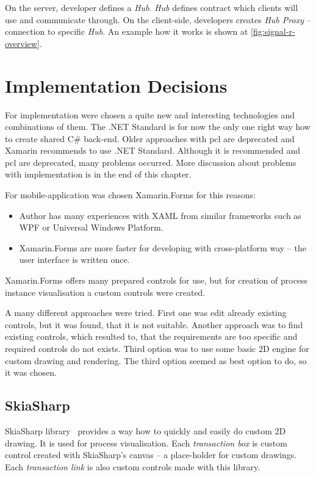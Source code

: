 On the server, developer defines a \textit{Hub}. \textit{Hub} defines contract which clients will use and communicate through. On the client-side, developers creates \textit{Hub Proxy} -- connection to specific \textit{Hub}. An example how it works is shown at \cref{fig:signal-r-overview}.
\section{Implementation Decisions}
For implementation were chosen a quite new and interesting technologies and combinations of them.
The .NET Standard is for now the only one right way how to create shared C\# back-end. Older approaches with \gls{pcl} are deprecated and Xamarin recommends to use .NET Standard. Although it is recommended and \gls{pcl} are deprecated, many problems occurred. More discussion about problems with implementation is in the end of this chapter.

For mobile-application was chosen Xamarin.Forms for this reasons:
\begin{itemize}
\item Author has many experiences with XAML from similar frameworks such as WPF or Universal Windows Platform.
\item Xamarin.Forms are more faster for developing with cross-platform way -- the user interface is written once.
\end{itemize}

Xamarin.Forms offers many prepared controls for use, but for creation of process instance visualisation a custom controls were created.  

A many different approaches were tried. First one was edit already existing controls, but it was found, that it is not suitable. Another approach was to find existing controls, which resulted to, that the requirements are too specific and required controls do not exists. Third option was to use some basic 2D engine for custom drawing and rendering. The third option seemed as best option to do, so it was chosen. 
\subsection{SkiaSharp}
SkiaSharp library~\cite{skiasharp} provides a way how to quickly and easily do custom 2D drawing. It is used for process visualisation. Each \textit{transaction box} is custom control created with SkiaSharp's canvas -- a place-holder for custom drawings. Each \textit{transaction link} is also custom controls made with this library. 
